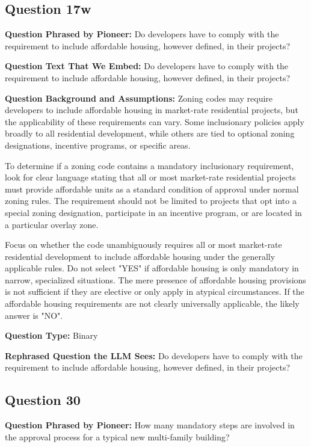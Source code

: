 \vspace{1cm}
\subsection*{Question 17w}
\noindent\textbf{Question Phrased by Pioneer:} Do developers have to comply with the requirement to include affordable housing, however defined, in their projects?

\noindent\textbf{Question Text That We Embed:} Do developers have to comply with the requirement to include affordable housing, however defined, in their projects?

\noindent\textbf{Question Background and Assumptions:} Zoning codes may require developers to include affordable housing in market-rate residential projects, but the applicability of these requirements can vary. Some inclusionary policies apply broadly to all residential development, while others are tied to optional zoning designations, incentive programs, or specific areas.

To determine if a zoning code contains a mandatory inclusionary requirement, look for clear language stating that all or most market-rate residential projects must provide affordable units as a standard condition of approval under normal zoning rules. The requirement should not be limited to projects that opt into a special zoning designation, participate in an incentive program, or are located in a particular overlay zone.

Focus on whether the code unambiguously requires all or most market-rate residential development to include affordable housing under the generally applicable rules. Do not select "YES" if affordable housing is only mandatory in narrow, specialized situations. The mere presence of affordable housing provisions is not sufficient if they are elective or only apply in atypical circumstances. If the affordable housing requirements are not clearly universally applicable, the likely answer is "NO".

\noindent\textbf{Question Type:} Binary

\noindent\textbf{Rephrased Question the LLM Sees:} Do developers have to comply with the requirement to include affordable housing, however defined, in their projects?

\vspace{1cm}
\subsection*{Question 30}
\noindent\textbf{Question Phrased by Pioneer:} How many mandatory steps are involved in the approval process for a typical new multi-family building?

